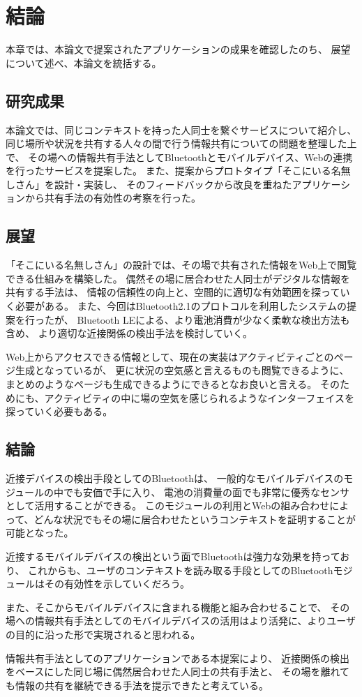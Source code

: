 \chapter{結論}\label{chap:conclusion}

本章では、本論文で提案されたアプリケーションの成果を確認したのち、
展望について述べ、本論文を統括する。

\newpage

\section{研究成果}

本論文では、同じコンテキストを持った人同士を繋ぐサービスについて紹介し、
同じ場所や状況を共有する人々の間で行う情報共有についての問題を整理した上で、
その場への情報共有手法としてBluetoothとモバイルデバイス、Webの連携を行ったサービスを提案した。
また、提案からプロトタイプ「そこにいる名無しさん」を設計・実装し、
そのフィードバックから改良を重ねたアプリケーションから共有手法の有効性の考察を行った。

\section{展望}

「そこにいる名無しさん」の設計では、その場で共有された情報をWeb上で閲覧できる仕組みを構築した。
偶然その場に居合わせた人同士がデジタルな情報を共有する手法は、
情報の信頼性の向上と、空間的に適切な有効範囲を探っていく必要がある。
また、今回はBluetooth2.1のプロトコルを利用したシステムの提案を行ったが、
Bluetooth LEによる、より電池消費が少なく柔軟な検出方法も含め、
より適切な近接関係の検出手法を検討していく。

Web上からアクセスできる情報として、現在の実装はアクティビティごとのページ生成となっているが、
更に状況の空気感と言えるものも閲覧できるように、まとめのようなページも生成できるようにできるとなお良いと言える。
そのためにも、アクティビティの中に場の空気を感じられるようなインターフェイスを探っていく必要もある。


\section{結論}

近接デバイスの検出手段としてのBluetoothは、
一般的なモバイルデバイスのモジュールの中でも安価で手に入り、
電池の消費量の面でも非常に優秀なセンサとして活用することができる。
このモジュールの利用とWebの組み合わせによって、どんな状況でもその場に居合わせたというコンテキストを証明することが可能となった。

近接するモバイルデバイスの検出という面でBluetoothは強力な効果を持っており、
これからも、ユーザのコンテキストを読み取る手段としてのBluetoothモジュールはその有効性を示していくだろう。

また、そこからモバイルデバイスに含まれる機能と組み合わせることで、
その場への情報共有手法としてのモバイルデバイスの活用はより活発に、よりユーザの目的に沿った形で実現されると思われる。

情報共有手法としてのアプリケーションである本提案により、
近接関係の検出をベースにした同じ場に偶然居合わせた人同士の共有手法と、
その場を離れても情報の共有を継続できる手法を提示できたと考えている。
